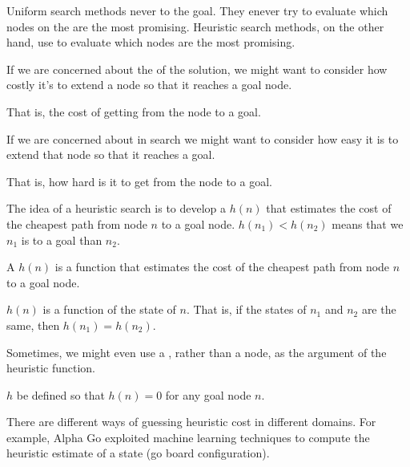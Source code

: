 Uniform search methods never  to the goal. They enever try to evaluate which nodes on the \Frontier are the most promising. Heuristic search methods, on the other hand, use  to evaluate which nodes are the most promising.

\begin{listu}
    \item If we are concerned about the  of the solution, we might want to consider how costly it's to extend a node so that it reaches a goal node.

    That is, the cost of getting from the node to a goal.

    \item If we are concerned about  in search we might want to consider how easy it is to extend that node so that it reaches a goal.

    That is, how hard is it to get from the node to a goal.
\end{listu}

The idea of a heuristic search is to develop a   $h(n)$ that estimates the cost of the cheapest path from node $n$ to a goal node. $h(n_1) < h(n_2)$ means that we  $n_1$ is  to a goal than $n_2$.

\begin{definition}\label{def:heuristic-function}
    A  $h(n)$ is a function that estimates the cost of the cheapest path from node $n$ to a goal node.
\end{definition}

\begin{remark}
    $h(n)$ is a function  of the state of $n$. That is, if the states of $n_1$ and $n_2$ are the same, then $h(n_1) = h(n_2)$.
\end{remark}

Sometimes, we might even use a , rather than a node, as the argument of the heuristic function.

\begin{remark}
    $h$  be defined so that $h(n) = 0$ for any goal node $n$.
\end{remark}

There are different ways of guessing heuristic cost in different domains. For example, Alpha Go exploited machine learning techniques to compute the heuristic estimate of a state (go board configuration).

